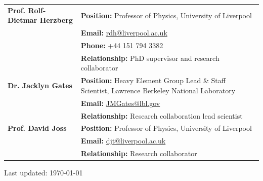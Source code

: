 \documentclass[a4paper,11pt]{article}
\begin{document}
\begin{tabularx}{\linewidth}{@{}l X@{}}

\textbf{Prof. Rolf-Dietmar Herzberg} & 
\textbf{Position:} Professor of Physics, University of Liverpool \\
& \textbf{Email:} \href{mailto:[rdh@liverpool.ac.uk]}{rdh@liverpool.ac.uk} \\
& \textbf{Phone:} +44 151 794 3382 \\
& \textbf{Relationship:} PhD supervisor and research collaborator \\[10pt]

\vspace{10pt}

\textbf{Dr. Jacklyn Gates} & 
\textbf{Position:} Heavy Element Group Lead \& Staff Scientist, Lawrence Berkeley National Laboratory \\
& \textbf{Email:} \href{mailto:[JMGates@lbl.gov]}{JMGates@lbl.gov} \\
& \textbf{Relationship:} Research collaboration lead scientist \\[10pt]

\textbf{Prof. David Joss} & 
\textbf{Position:} Professor of Physics, University of Liverpool \\
& \textbf{Email:} \href{mailto:[djt@liverpool.ac.uk]}{djt@liverpool.ac.uk} \\
& \textbf{Relationship:} Research collaborator \\[10pt]

\end{tabularx}

\vfill
\begin{center}
\footnotesize Last updated: \today
\end{center}
\end{document}
